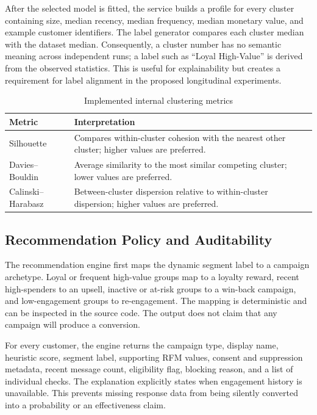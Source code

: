 \documentclass[conference]{IEEEtran}
\begin{document}
After the selected model is fitted, the service builds a profile for every cluster containing size, median recency, median frequency, median monetary value, and example customer identifiers. The label generator compares each cluster median with the dataset median. Consequently, a cluster number has no semantic meaning across independent runs; a label such as ``Loyal High-Value'' is derived from the observed statistics. This is useful for explainability but creates a requirement for label alignment in the proposed longitudinal experiments.

\begin{table}[!t]
\caption{Implemented internal clustering metrics}
\label{tab:metric-definitions}
\centering
\small
\begin{tabular}{p{}p{}}
\toprule
Metric & Interpretation \\
\midrule
Silhouette & Compares within-cluster cohesion with the nearest other cluster; higher values are preferred. \\
Davies--Bouldin & Average similarity to the most similar competing cluster; lower values are preferred. \\
Calinski--Harabasz & Between-cluster dispersion relative to within-cluster dispersion; higher values are preferred. \\
\bottomrule
\end{tabular}
\end{table}

\subsection{Recommendation Policy and Auditability}
The recommendation engine first maps the dynamic segment label to a campaign archetype. Loyal or frequent high-value groups map to a loyalty reward, recent high-spenders to an upsell, inactive or at-risk groups to a win-back campaign, and low-engagement groups to re-engagement. The mapping is deterministic and can be inspected in the source code. The output does not claim that any campaign will produce a conversion.

For every customer, the engine returns the campaign type, display name, heuristic score, segment label, supporting RFM values, consent and suppression metadata, recent message count, eligibility flag, blocking reason, and a list of individual checks. The explanation explicitly states when engagement history is unavailable. This prevents missing response data from being silently converted into a probability or an effectiveness claim.
\end{document}
